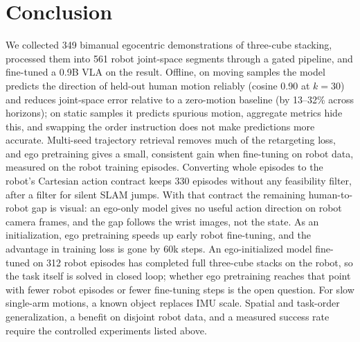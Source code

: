 \documentclass[conference,10pt]{IEEEtran}
\begin{document}
\section{Conclusion}
We collected 349 bimanual egocentric demonstrations of three-cube stacking, processed them into 561 robot joint-space segments
through a gated pipeline, and fine-tuned a 0.9B VLA on the result. Offline, on moving samples the model predicts the
direction of held-out human motion reliably (cosine 0.90 at $k{=}30$) and reduces joint-space error relative to a zero-motion
baseline (by 13--32\% across horizons); on static samples it predicts spurious motion, aggregate metrics hide this, and
swapping the order instruction does not make predictions more accurate. Multi-seed trajectory retrieval removes much of the
retargeting loss, and ego pretraining gives a small, consistent gain when fine-tuning on robot data, measured on the robot
training episodes. Converting whole episodes to the robot's Cartesian action contract keeps 330 episodes without any
feasibility filter, after a filter for silent SLAM jumps. With that contract the remaining human-to-robot gap is visual: an
ego-only model gives no useful action direction on robot camera frames, and the gap follows the wrist images, not the state.
As an initialization, ego pretraining speeds up early robot fine-tuning, and the advantage in training loss is gone by
60k steps. An ego-initialized model fine-tuned on 312 robot episodes has completed full three-cube stacks on the robot, so
the task itself is solved in closed loop; whether ego pretraining reaches that point with fewer robot episodes or fewer
fine-tuning steps is the open question. For slow single-arm motions, a known object replaces IMU scale. Spatial and
task-order generalization, a benefit on disjoint robot data, and a measured success rate require the controlled
experiments listed above.
\end{document}
